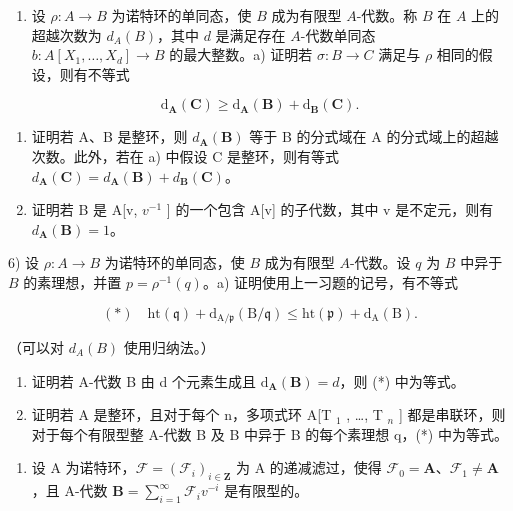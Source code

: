 \begin{enumerate}
\def\labelenumi{\arabic{enumi})}
\setcounter{enumi}{4}
\tightlist
\item
  设 \(\rho: A \to B\) 为诺特环的单同态，使 \(B\) 成为有限型 \(A\)-代数。称 \(B\) 在 \(A\) 上的超越次数为 \(d_A(B)\)，其中 \(d\) 是满足存在 \(A\)-代数单同态 \(b: A[X_1, \ldots, X_d] \to B\) 的最大整数。a) 证明若 \(\sigma: B \to C\) 满足与 \(\rho\) 相同的假设，则有不等式
\end{enumerate}

\[
\mathrm{d} _ {\mathbf {A}} (\mathbf {C}) \geqslant \mathrm{d} _ {\mathbf {A}} (\mathbf {B}) + \mathrm{d} _ {\mathbf {B}} (\mathbf {C}).
\]

\begin{enumerate}
\def\labelenumi{\alph{enumi})}
\setcounter{enumi}{1}
\item
  证明若 A、B 是整环，则 \(d_{\mathbf{A}}(\mathbf{B})\) 等于 B 的分式域在 A 的分式域上的超越次数。此外，若在 a) 中假设 C 是整环，则有等式 \(d_{\mathbf{A}}(\mathbf{C}) = d_{\mathbf{A}}(\mathbf{B}) + d_{\mathbf{B}}(\mathbf{C})\)。
\item
  证明若 B 是 A{[}v, \(v^{-1}\) {]} 的一个包含 A{[}v{]} 的子代数，其中 v 是不定元，则有 \(d_{\mathbf{A}}(\mathbf{B}) = 1\)。
\end{enumerate}

  6) 设 \(\rho: A \to B\) 为诺特环的单同态，使 \(B\) 成为有限型 \(A\)-代数。设 \(q\) 为 \(B\) 中异于 \(B\) 的素理想，并置 \(p = \rho^{-1}(q)\)。a) 证明使用上一习题的记号，有不等式

\[
(*) \quad \mathrm{ht} (\mathfrak {q}) + \mathrm{d} _ {\mathrm{A} / \mathfrak {p}} (\mathrm{B} / \mathfrak {q}) \leqslant \mathrm{ht} (\mathfrak {p}) + \mathrm{d} _ {\mathrm{A}} (\mathrm{B}).
\]

（可以对 \(d_{A}(B)\) 使用归纳法。）

\begin{enumerate}
\def\labelenumi{\alph{enumi})}
\setcounter{enumi}{1}
\item
  证明若 A-代数 B 由 d 个元素生成且 \(\mathrm{d}_{\mathbf{A}}(\mathbf{B}) = d\)，则 (*) 中为等式。
\item
   证明若 A 是整环，且对于每个 n，多项式环 A{[}T \(_{1}\) , \ldots, T \(_{n}\) {]} 都是串联环，则对于每个有限型整 A-代数 B 及 B 中异于 B 的每个素理想 q，(*) 中为等式。
\end{enumerate}

\begin{enumerate}
\def\labelenumi{\arabic{enumi})}
\setcounter{enumi}{6}
\tightlist
\item
  设 A 为诺特环，\(\mathcal{F} = (\mathcal{F}_i)_{i\in \mathbf{Z}}\) 为 A 的递减滤过，使得 \(\mathcal{F}_0 = \mathbf{A}\)、\(\mathcal{F}_1 \neq \mathbf{A}\)，且 A-代数 \(\mathbf{B} = \sum_{i=1}^{\infty} \mathcal{F}_i v^{-i}\) 是有限型的。
\end{enumerate}

